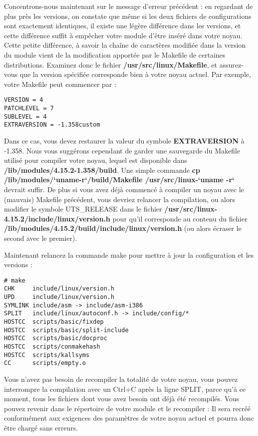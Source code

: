 \documentclass[11pt]{article}
\begin{document}
Concentrons-nous maintenant sur le message d'erreur précédent : en regardant de plus près les versions, on constate que même si les deux fichiers de configurations sont exactement identiques, il existe une légère différence dans les versions, et cette différence suffit à empêcher votre module d'être inséré dans votre noyau. Cette petite différence, à savoir la chaîne de caractères modifiée dans la version du module vient de la modification apportée par le Makefile de certaines distributions. Examinez donc le fichier \textbf{/usr/src/linux/Makefile}, et assurez-vous que la version spécifiée corresponde bien à votre noyau actuel. Par exemple, votre Makefile peut commencer par :

\begin{verbatim}
VERSION = 4
PATCHLEVEL = 7
SUBLEVEL = 4
EXTRAVERSION = -1.358custom
\end{verbatim}

Dans ce cas, vous devez restaurer la valeur du symbole \textbf{EXTRAVERSION} à -1.358. Nous vous suggérons cependant de garder une sauvegarde du Makefile utilisé pour compiler votre noyau, lequel est disponible dans \textbf{/lib/modules/4.15.2-1.358/build}. Une simple commande \textbf{cp /lib/modules/`uname-r`/build/Makefile /usr/src/linux-`uname -r`} devrait suffir. De plus si vous avez déjà commencé à compiler un noyau avec le (mauvais) Makefile précédent, vous devriez relancer la compilation, ou alors modifier le symbole UTS\_RELEASE dans le fichier \textbf{/usr/src/linux-4.15.2/include/linux/version.h} pour qu'il corresponde au contenu du fichier \textbf{/lib/modules/4.15.2/build/include/linux/version.h} (ou alors écraser le second avec le premier).

Maintenant relancez la commande make pour mettre à jour la configuration et les versions :

\begin{verbatim}
# make
CHK     include/linux/version.h
UPD     include/linux/version.h
SYMLINK include/asm -> include/asm-i386
SPLIT   include/linux/autoconf.h -> include/config/*
HOSTCC  scripts/basic/fixdep
HOSTCC  scripts/basic/split-include
HOSTCC  scripts/basic/docproc
HOSTCC  scripts/conmakehash
HOSTCC  scripts/kallsyms
CC      scripts/empty.o
\end{verbatim}

Vous n'avez pas besoin de recompiler la totalité de votre noyau, vous pouvez interrompre la compilation avec un Ctrl+C après la ligne SPLIT, parce qu'à ce moment, tous les fichiers dont vous avez besoin ont déjà été recompilés. Vous pouvez revenir dans le répertoire de votre module et le recompiler : Il sera recréé conformément aux exigences des paramètres de votre noyau actuel et pourra donc être chargé sans erreurs.
\end{document}
